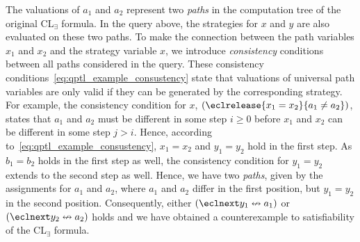 \documentclass{LMCS}
\theoremstyle{plain}\newtheorem{theorem}[thm]{Theorem}
\theoremstyle{plain}\newtheorem{lemma}[thm]{Lemma}
\theoremstyle{plain}\newtheorem{proposition}[thm]{Proposition}
\theoremstyle{plain}\newtheorem{corollary}[thm]{Corollary}
\theoremstyle{definition}\newtheorem{definition}{Definition}[section]
\begin{document}
The valuations of $a_1$ and $a_2$ represent two \emph{paths} in the computation tree of the original CL$_\exists$ formula.
In the query above, the strategies for $x$ and $y$ are also evaluated on these two paths.
To make the connection between the path variables $x_1$ and $x_2$ and the strategy variable $x$, we introduce \emph{consistency} conditions between all paths considered in the query.
These consistency conditions~\eqref{eq:qptl_example_consustency} state that valuations of universal path variables are only valid if they can be generated by the corresponding strategy.
For example, the consistency condition for $x$, $(\eclrelease{x_1 = x_2}{a_1 \neq a_2})$, states that $a_1$ and $a_2$ must be different in some step $i \geq 0$ before $x_1$ and $x_2$ can be different in some step $j > i$.
Hence, according to~\eqref{eq:qptl_example_consustency}, $x_1 = x_2$ and $y_1 = y_2$ hold in the first step.
As $b_1 = b_2$ holds in the first step as well, the consistency condition for $y_1 = y_2$ extends to the second step as well.
Hence, we have two \emph{paths}, given by the assignments for $a_1$ and $a_2$, where $a_1$ and $a_2$ differ in the first position, but $y_1 = y_2$ in the second position.
Consequently, either $(\eclnext y_1 \nleftrightarrow a_1)$ or $(\eclnext y_2 \nleftrightarrow a_2)$ holds and we have obtained a counterexample to satisfiability of the CL$_\exists$ formula.
\end{document}
